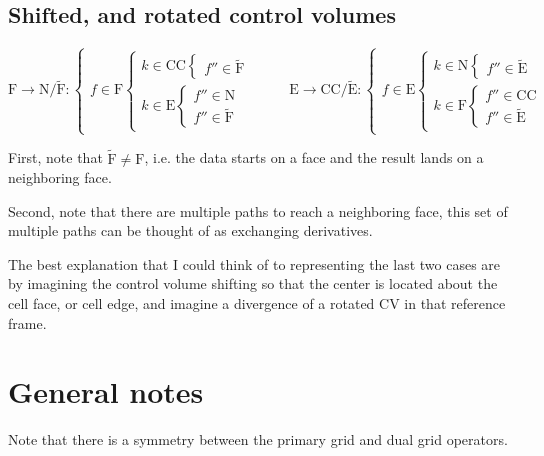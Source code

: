 \documentclass[11pt]{article}
\begin{document}
\subsection{Shifted, and rotated control volumes}

\begin{equation}
	\text{F} \rightarrow \text{N}/\tilde{\text{F}} : 
	\begin{cases}
		f \in \text{F}
		\begin{cases}
		k \in \text{CC} 
			\begin{cases}
			f'' \in \tilde{\text{F}}
			\end{cases}
		\\
		k \in \text{E}
			\begin{cases}
			f'' \in \text{N} \\
			f'' \in \tilde{\text{F}}
			\end{cases}
		\end{cases}
	\end{cases}
	\qquad
	\text{E} \rightarrow \text{CC}/\tilde{\text{E}} : 
	\begin{cases}
		f \in \text{E}
		\begin{cases}
		k \in \text{N} 
			\begin{cases}
			f'' \in \tilde{\text{E}}
			\end{cases}
		\\
		k \in \text{F}
			\begin{cases}
			f'' \in \text{CC} \\
			f'' \in \tilde{\text{E}}
			\end{cases}
		\end{cases}
	\end{cases}
\end{equation}

First, note that $\tilde{\text{F}} \ne \text{F}$, i.e. the data starts on a face and the result lands on a neighboring face. 

Second, note that there are multiple paths to reach a neighboring face, this set of multiple paths can be thought of as exchanging derivatives.

The best explanation that I could think of to representing the last two cases are by imagining the control volume shifting so that the center is located about the cell face, or cell edge, and imagine a divergence of a rotated CV in that reference frame.

\section{General notes}

Note that there is a symmetry between the primary grid and dual grid operators.
\end{document}
